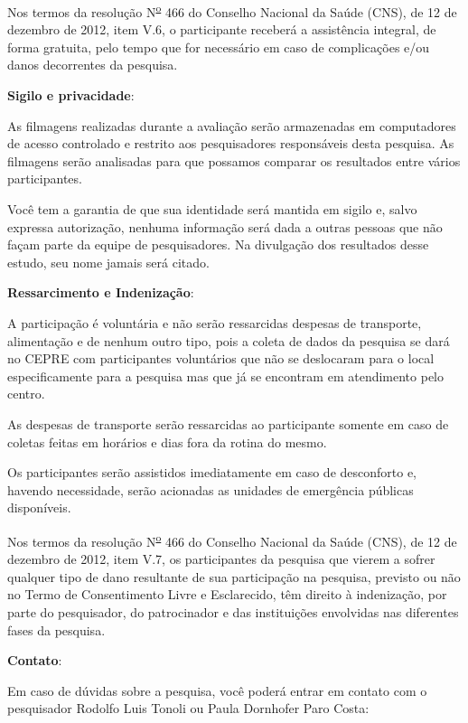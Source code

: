 \documentclass[a4paper, 12pt]{article}
\begin{document}
Nos termos da resolução N\textsuperscript{\underline{o}} 466 do Conselho Nacional da Saúde (CNS), de 12 de dezembro de 2012, item V.6, o participante receberá a assistência integral, de forma gratuita, pelo tempo que for necessário em caso de complicações e/ou danos decorrentes da pesquisa.

\vspace{10pt}
\textbf{Sigilo e privacidade}:

As filmagens realizadas durante a avaliação serão armazenadas em computadores de acesso controlado e restrito aos pesquisadores responsáveis desta pesquisa. As filmagens serão analisadas para que possamos comparar os resultados entre vários participantes.

Você tem a garantia de que sua identidade será mantida em sigilo e, salvo expressa autorização, nenhuma informação será dada a outras pessoas que não façam parte da equipe de pesquisadores. Na divulgação dos resultados desse estudo, seu nome jamais será citado.


\vspace{10pt}
\textbf{Ressarcimento e Indenização}:
	
A participação é voluntária e não serão ressarcidas despesas de transporte, alimentação e de nenhum outro tipo, pois a coleta de dados da pesquisa se dará no CEPRE com participantes voluntários que não se deslocaram para o local especificamente para a pesquisa mas que já se encontram em atendimento pelo centro.

As despesas de transporte serão ressarcidas ao participante somente em caso de coletas feitas em horários e dias fora da rotina do mesmo.

Os participantes serão assistidos imediatamente em caso de desconforto e, havendo necessidade, serão acionadas as unidades de emergência públicas disponíveis. 

Nos termos da resolução N\textsuperscript{\underline{o}} 466 do Conselho Nacional da Saúde (CNS), de 12 de dezembro de 2012, item V.7, os participantes da pesquisa que vierem a sofrer qualquer tipo de dano resultante de sua participação na pesquisa, previsto ou não no Termo de Consentimento Livre e Esclarecido, têm direito à indenização, por parte do pesquisador, do patrocinador e das instituições envolvidas nas diferentes fases da pesquisa.

\vspace{10pt}
\textbf{Contato}:

Em caso de dúvidas sobre a pesquisa, você poderá entrar em contato com o pesquisador Rodolfo Luis Tonoli ou Paula Dornhofer Paro Costa:
\end{document}
